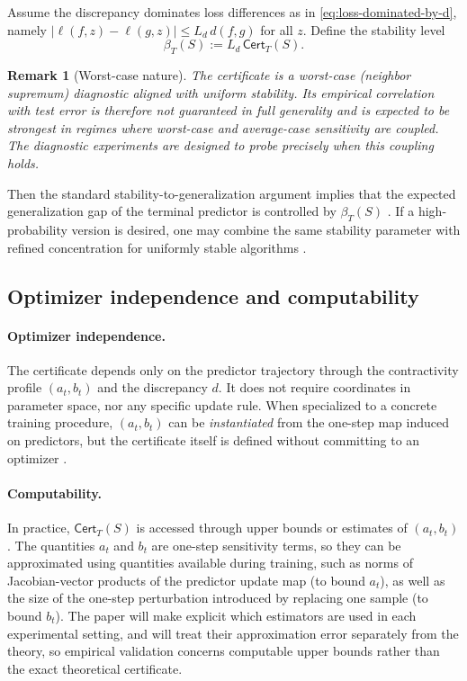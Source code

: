 \documentclass{article}
\newtheorem{remark}[theorem]{Remark}
\numberwithin{equation}{section}
\begin{document}
Assume the discrepancy dominates loss differences as in \eqref{eq:loss-dominated-by-d}, namely
$|\ell(f,z)-\ell(g,z)|\le L_d\, d(f,g)$ for all $z$.
Define the stability level
\begin{equation}
	\label{eq:beta-from-cert}
	\beta_T(S) := L_d\, \mathsf{Cert}_T(S).
\end{equation}

\begin{remark}[Worst-case nature]
	The certificate is a worst-case (neighbor supremum) diagnostic aligned with uniform stability. Its empirical correlation with test error is therefore not guaranteed in full generality and is expected to be strongest in regimes where worst-case and average-case sensitivity are coupled. The diagnostic experiments are designed to probe precisely when this coupling holds. \end{remark}
	
Then the standard stability-to-generalization argument implies that the expected generalization gap of the terminal predictor is controlled by $\beta_T(S)$ \cite{bousquet2002stability}. If a high-probability version is desired, one may combine the same stability parameter with refined concentration for uniformly stable algorithms \cite{pmlr-v99-feldman19a}.

\subsection{Optimizer independence and computability}
\label{subsec:certificate-compute}

\paragraph{Optimizer independence.}
The certificate depends only on the predictor trajectory through the contractivity profile $(a_t,b_t)$ and the discrepancy $d$. It does not require coordinates in parameter space, nor any specific update rule. When specialized to a concrete training procedure, $(a_t,b_t)$ can be \emph{instantiated} from the one-step map induced on predictors, but the certificate itself is defined without committing to an optimizer \cite{pmlr-v48-hardt16}.

\paragraph{Computability.}
In practice, $\mathsf{Cert}_T(S)$ is accessed through upper bounds or estimates of $(a_t,b_t)$. The quantities $a_t$ and $b_t$ are one-step sensitivity terms, so they can be approximated using quantities available during training, such as norms of Jacobian-vector products of the predictor update map (to bound $a_t$), as well as the size of the one-step perturbation introduced by replacing one sample (to bound $b_t$). The paper will make explicit which estimators are used in each experimental setting, and will treat their approximation error separately from the theory, so empirical validation concerns computable upper bounds rather than the exact theoretical certificate.
\end{document}
